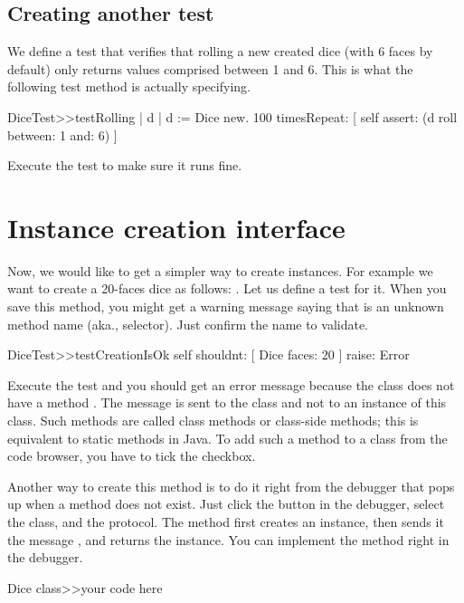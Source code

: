 \documentclass[a4paper,10pt,twoside]{book}
\begin{document}
\subsection{ Creating another test}
We define a test that verifies that rolling a new created dice (with 6 faces by default) only returns values comprised between 1 and 6. This is what the following test method is actually specifying.


\begin{code}{}
DiceTest>>testRolling
    | d |
    d := Dice new.
    100 timesRepeat: [ self assert: (d roll between: 1 and: 6) ]
\end{code}


Execute the test to make sure it runs fine.
\section{ Instance creation interface}
Now, we would like to get a simpler way to create  instances. For example we want to create a 20-faces dice as follows: . Let us define a test for it. When you save this method, you might get a warning message saying that  is an unknown method name (aka., selector). Just confirm the name to validate.


\begin{code}{}
DiceTest>>testCreationIsOk
    self shouldnt: [ Dice faces: 20 ] raise: Error
\end{code}


Execute the test and you should get an error message because the class  does not have a method . The message  is sent to the class  and not to an instance of this class. Such methods are called class methods or class-side methods; this is equivalent to static methods in Java. To add such a method to a class from the code browser, you have to tick the  checkbox.

Another way to create this method is to do it right from the debugger that pops up when a method does not exist. Just click the  button in the debugger, select the  class, and the  protocol. The method first creates an instance, then sends it the message , and returns the instance. You can implement the method right in the debugger.


\begin{code}{}
Dice class>>your code here
\end{code}
\end{document}

